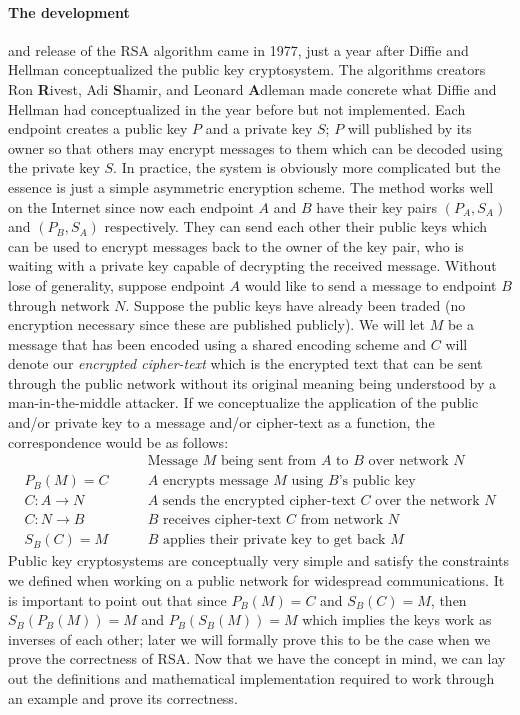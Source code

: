 \documentclass[12pt]{article}
\theoremstyle{remark}
\begin{document}
\paragraph{The development} and release of the RSA algorithm came in 1977, just a year after Diffie and Hellman conceptualized the public key cryptosystem.  The algorithms creators Ron \textbf{R}ivest, Adi \textbf{S}hamir, and Leonard \textbf{A}dleman made concrete what Diffie and Hellman had conceptualized in the year before but not implemented.  Each endpoint creates a public key $P$ and a private key $S$; $P$ will published by its owner so that others may encrypt messages to them which can be decoded using the private key $S$.  In practice, the system is obviously more complicated but the essence is just a simple asymmetric encryption scheme.  The method works well on the Internet since now each endpoint $A$ and $B$ have their key pairs $(P_A,S_A)$ and $(P_B, S_A)$ respectively.  They can send each other their public keys which can be used to encrypt messages back to the owner of the key pair, who is waiting with a private key capable of decrypting the received message.  Without lose of generality, suppose endpoint $A$ would like to send a message to endpoint $B$ through network $N$.  Suppose the public keys have already been traded (no encryption necessary since these are published publicly).  We will let $M$ be a message that has been encoded using a shared encoding scheme and $C$ will denote our \textit{encrypted cipher-text} which is the encrypted text that can be sent through the public network without its original meaning being understood by a man-in-the-middle attacker.  If we conceptualize the application of the public and/or private key to a message and/or cipher-text as a function, the correspondence would be as follows:
\begin{align*}
&\qquad\text{Message $M$ being sent from $A$ to $B$ over network $N$}\\
P_B(M)=C	&\qquad\text{$A$ encrypts message $M$ using $B$'s public key}\\
C: A\rightarrow N	&\qquad\text{$A$ sends the encrypted cipher-text $C$ over the network $N$}\\
C: N\rightarrow B	&\qquad\text{$B$ receives cipher-text $C$ from network $N$}\\
S_B(C)=M	&\qquad\text{$B$ applies their private key to get back $M$} 
\end{align*}
Public key cryptosystems are conceptually very simple and satisfy the constraints we defined when working on a public network for widespread communications.  It is important to point out that since $P_B(M)=C$ and $S_B(C)=M$, then $S_B(P_B(M))=M$ and $P_B(S_B(M))=M$ which implies the keys work as inverses of each other; later we will formally prove this to be the case when we prove the correctness of RSA.  Now that we have the concept in mind, we can lay out the definitions and mathematical implementation required to work through an example and prove its correctness.
\end{document}
